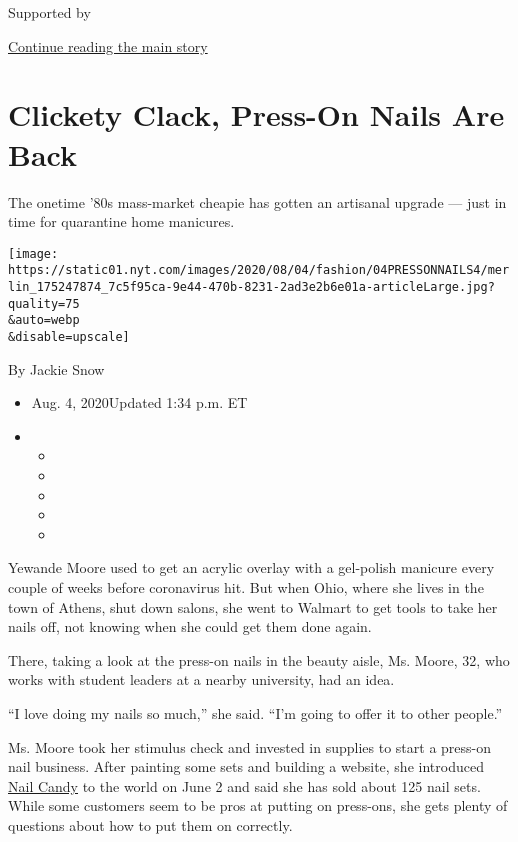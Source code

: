 Supported by

\protect\hyperlink{after-sponsor}{Continue reading the main story}

\hypertarget{clickety-clack-press-on-nails-are-back}{%
\section{Clickety Clack, Press-On Nails Are
Back}\label{clickety-clack-press-on-nails-are-back}}

The onetime '80s mass-market cheapie has gotten an artisanal upgrade ---
just in time for quarantine home manicures.

\texttt{[image: https://static01.nyt.com/images/2020/08/04/fashion/04PRESSONNAILS4/merlin\_175247874\_7c5f95ca-9e44-470b-8231-2ad3e2b6e01a-articleLarge.jpg?quality=75\\\&auto=webp\\\&disable=upscale]}

By Jackie Snow

\begin{itemize}
\item
  Aug. 4, 2020Updated 1:34 p.m. ET
\item
  \begin{itemize}
  \item
  \item
  \item
  \item
  \item
  \end{itemize}
\end{itemize}

Yewande Moore used to get an acrylic overlay with a gel-polish manicure
every couple of weeks before coronavirus hit. But when Ohio, where she
lives in the town of Athens, shut down salons, she went to Walmart to
get tools to take her nails off, not knowing when she could get them
done again.

There, taking a look at the press-on nails in the beauty aisle, Ms.
Moore, 32, who works with student leaders at a nearby university, had an
idea.

``I love doing my nails so much,'' she said. ``I'm going to offer it to
other people.''

Ms. Moore took her stimulus check and invested in supplies to start a
press-on nail business. After painting some sets and building a website,
she introduced \href{https://nailcandypressons.squarespace.com/}{Nail
Candy} to the world on June 2 and said she has sold about 125 nail sets.
While some customers seem to be pros at putting on press-ons, she gets
plenty of questions about how to put them on correctly.

